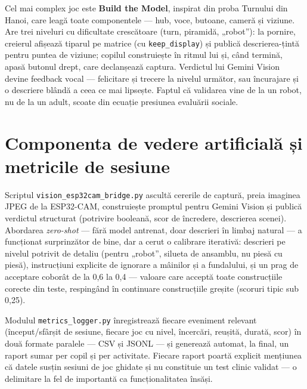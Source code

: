 Cel mai complex joc este \textbf{Build the Model}, inspirat din proba Turnului din Hanoi, care leagă toate componentele — hub, voce, butoane, cameră și viziune. Are trei niveluri cu dificultate crescătoare (turn, piramidă, „robot”): la pornire, creierul afișează tiparul pe matrice (cu \texttt{keep\_display}) și publică descrierea-țintă pentru puntea de viziune; copilul construiește în ritmul lui și, când termină, apasă butonul drept, care declanșează captura. Verdictul lui Gemini Vision devine feedback vocal — felicitare și trecere la nivelul următor, sau încurajare și o descriere blândă a ceea ce mai lipsește. Faptul că validarea vine de la un robot, nu de la un adult, scoate din ecuație presiunea evaluării sociale.

\section{Componenta de vedere artificială și metricile de sesiune}
\label{sec:viziune}

Scriptul \texttt{vision\_esp32cam\_bridge.py} ascultă cererile de captură, preia imaginea JPEG de la ESP32-CAM, construiește promptul pentru Gemini Vision și publică verdictul structurat (potrivire booleană, scor de încredere, descrierea scenei). Abordarea \emph{zero-shot} — fără model antrenat, doar descrieri în limbaj natural — a funcționat surprinzător de bine, dar a cerut o calibrare iterativă: descrieri pe nivelul potrivit de detaliu (pentru „robot”, silueta de ansamblu, nu piesă cu piesă), instrucțiuni explicite de ignorare a mâinilor și a fundalului, și un prag de acceptare coborât de la 0,6 la 0,4 — valoare care acceptă toate construcțiile corecte din teste, respingând în continuare construcțiile greșite (scoruri tipic sub 0,25).

Modulul \texttt{metrics\_logger.py} înregistrează fiecare eveniment relevant (început/sfârșit de sesiune, fiecare joc cu nivel, încercări, reușită, durată, scor) în două formate paralele — CSV și JSONL — și generează automat, la final, un raport sumar per copil și per activitate. Fiecare raport poartă explicit mențiunea că datele susțin sesiuni de joc ghidate și nu constituie un test clinic validat — o delimitare la fel de importantă ca funcționalitatea însăși.
